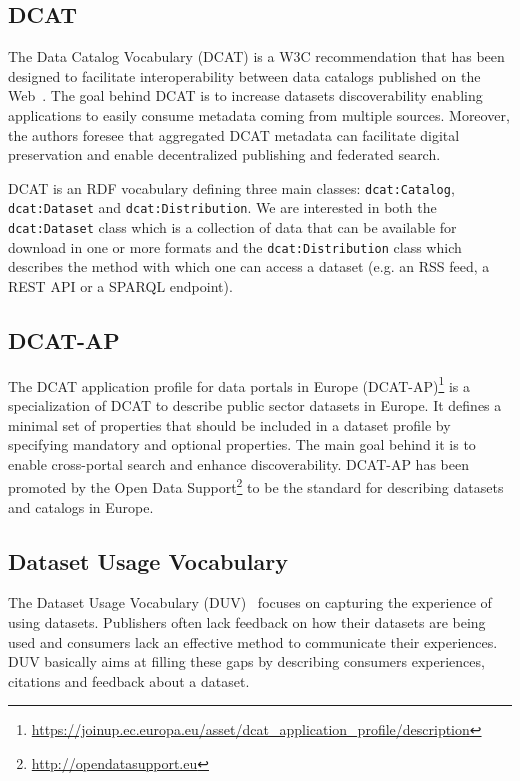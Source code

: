 \subsection{DCAT}
The Data Catalog Vocabulary (DCAT) is a W3C recommendation that has been designed to facilitate interoperability between data catalogs published on the Web~\cite{Erickson:DCV:14}. The goal behind DCAT is to increase datasets discoverability enabling applications to easily consume metadata coming from multiple sources. Moreover, the authors foresee that aggregated DCAT metadata can facilitate digital preservation and enable decentralized publishing and federated search.

DCAT is an RDF vocabulary defining three main classes: \texttt{dcat:Catalog},\\\texttt{dcat:Dataset} and \texttt{dcat:Distribution}. We are interested in both the \\\texttt{dcat:Dataset} class which is a collection of data that can be available for download in one or more formats and the \texttt{dcat:Distribution} class which describes the method with which one can access a dataset (e.g. an RSS feed, a REST API or a SPARQL endpoint).

\subsection{DCAT-AP}
The DCAT application profile for data portals in Europe (DCAT-AP)\footnote{\url{https://joinup.ec.europa.eu/asset/dcat\_application\_profile/description}} is a specialization of DCAT to describe public sector datasets in Europe. It defines a minimal set of properties that should be included in a dataset profile by specifying mandatory and optional properties. The main goal behind it is to enable cross-portal search and enhance discoverability. DCAT-AP has been promoted by the Open Data Support\footnote{\url{http://opendatasupport.eu}} to be the standard for describing datasets and catalogs in Europe.

\subsection{Dataset Usage Vocabulary}
The Dataset Usage Vocabulary (DUV)~\cite{Loscio:DUV:15} focuses on capturing the experience of using datasets. Publishers often lack feedback on how their datasets are being used and consumers lack an effective method to communicate their experiences. DUV basically aims at filling these gaps by describing consumers experiences, citations and feedback about a dataset.

